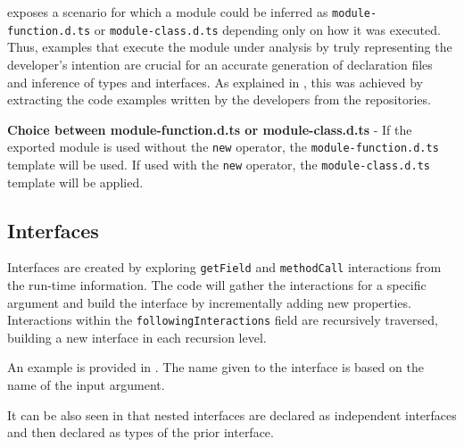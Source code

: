  exposes a scenario for which a module could be inferred as \texttt{module-function.d.ts} or \texttt{module-class.d.ts} depending only on how it was executed. Thus, examples that execute the module under analysis by truly representing the developer's intention are crucial for an accurate generation of declaration files and inference of types and interfaces. As explained in , this was achieved by extracting the code examples written by the developers from the repositories.

\begin{code}
  \caption[Choice between module-function.d.ts or module-class.d.ts]{\textbf{Choice between module-function.d.ts or module-class.d.ts} - If the exported module is used without the \texttt{new} operator, the \texttt{module-function.d.ts} template will be used. If used with the \texttt{new} operator, the \texttt{module-class.d.ts} template will be applied.}
  \label{code:typescript-templates-function-as-constructor}
\end{code}

\subsection{Interfaces}
Interfaces are created by exploring \texttt{getField} and \texttt{methodCall} interactions from the run-time information. The code will gather the interactions for a specific argument and build the interface by incrementally adding new properties. Interactions within the \texttt{followingInteractions} field are recursively traversed, building a new interface in each recursion level.

An example is provided in . The name given to the interface is based on the name of the input argument.

It can be also seen in  that nested interfaces are declared as independent interfaces and then declared as types of the prior interface.





